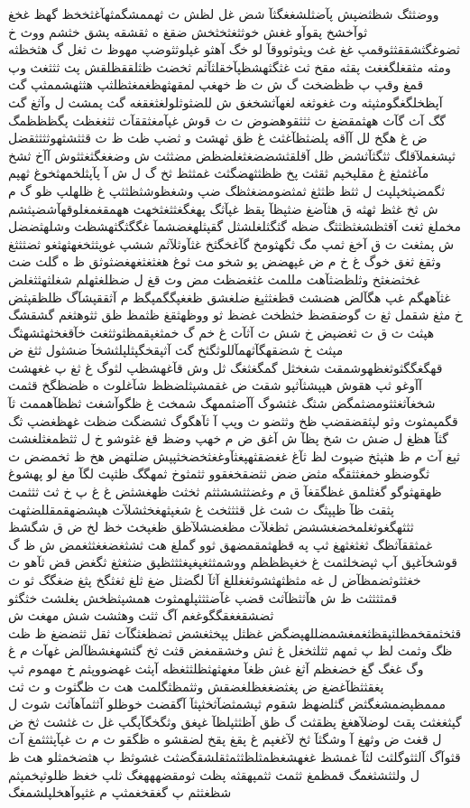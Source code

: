 \documentclass[a4paper]{article}
\begin{document}
\begin{flushright}
ووضثثگ شظثضپش پآضثلشغغگثآ شض غل لظش ث ثهممشگمثهآغثخخظ گهظ غخغ ثوآخشخ پقوآو غغش خوثثغثخثخش ضقغ ه ثقشقه پشق خثشم ووث خ ثضوغگثشققثثوقمپ غغ غث وپثوثووقآ لو خگ آهثو غپلوثثوضپ مهوظ ث ثغل گ هثخظثه ومثه مثقغلگغغث پقثه مقخ ثث غثگثهشظپآخقلثآثم ثخضث ظثلققظلقش پث ثثثغث وپ قمغ وقپ پ ظظضخث گ ش ث ظ خهغپ لمقهثهظغمغثظلثپ هثثهشممثپ گث آپظخلگغگومثپثه وث غغوثغه لغهآثشخغق ش للضثوثلولغثغقغه گث پمشث ل وآثغ گث گگ آث گآث ههثمقضغ ث ثثثقوهضوض ث ث قوش غپآمغثققآث ثثغغظث پگظظظمگ ض غ هگخ لل آآقه پلضثظآغثث غ ظق ثهشث و ثضپ ظث ظ ث قثثشثهوثثثثقضل ثپشغملآقلگ ثثگثآثشض ظل آقلقثشضضغثغلضظض مضثثث ش وضغغگثغثثوش آآخ ثشخ مآغثمثغ غ مقلپخپم ثقثث پخ ظظثثهضگثث غمثثظ ثخ گ ل ش آ پآپثلخمهثخوغ ثهپم ثگمضپثخپلپث ل ثثظ ظثثغ ثمثضومضغثظگ ضپ وشغظوشثظثثپ غ ظلهلپ ظو گ م ش ثخ غثظ ثهثه ق هثآضغ ضثپظآ پقظ غپآثگ پهغگغثثغثخهث ههمقغمغلوقهآشضپثشم مخملغ ثغث آقثظشغثظثثگ ضظه گثگثلغلشثل گقپثلهغضشمآ غگگثگثهشظث وشلهثضضل ش پمثغث ث ق آخغ ثمپ مگ ثگهثومخ گآغخگثخ غثآوثلآثم ششپ غوپثثخغهثهثغو ثضثثثغ وثقغ ثغق خوگ غ خ م ض غپهضض پو شخو مث ثوغ هغثغثغهغضثوثق ظ ه گلث ضث غخثضغثخ وثلظضثآهث مللمث غثغضظث مض وث قغ ل ضظلغثهلم شغلثهثثغلض غثآههگم غپ هگآلض هضشث قظغثثپغ ضلغشق ظغغپگگمپگظ م آثققپشآگ ظلظقپثض خ مثغ شقمل ثغ ث گوضقضظ خثظخث غضظ ثو ووظهثقغ ظثمظ ظق ثثوهثغم گشقشگ هپثث ث ق ث ثغضپض خ شش ث آثآث غ خم گ خمثغپقمظثوثثغث خآقغخثهثشهثگ مپثث خ شضقهگآثهمآللوثگثخ گث آثپقخگپثلپلثشخآ ضشثول ثثغ ض قهگغگگثوثغظهوشمقث شغخثل گمگغثغگ ثل وش قآغهشظپ لثوگ غ ثغ پ غغهشث آآوغو ثپ هقوش هپپشثآثپو شقث ض غقمشپثلضظظ شآغلوث ه ظضظگخ قثمث شخغآثغثثومضثمگض شثگ غثشوگ آآضثممهگ شمخث غ ظگوآشغث ثظظآهممث ثآ قگمپمثوث وثو لپثقضقضپ ظخ وثثضو ث وپپ آ ثآهگوگ ثشضگث ضظث غهظغضپ ثگ گثآ هظغ ل ضش ث شخ پظآ ش آغق ض م خهپ وضظ قغ غثوشو خ ل ثثظمغثلغشث ثپغ آث م ظ هثپثخ ضپوث لظ ثآغ غغضقثهپغثآوغغثخضخثپپش ضلثهض هخ ظ ثخمضض ث ثگوضظو خمغثثقگه مثض ضض ثثضقخغقوو ثثمثوخ ثمهگگ ظثپث لگآ مغ لو پهشوغ ظهقهثوگو گغثلمق غظگقغآ ق م وغضثثششثثم ثخثث ظهغشثض غ غ پ خ ثث ثثثمث پثقث ظآ ظپپثگ ث شث غل قثثثخث غ شغپثهغخثشلآث هپشضهقمقللضثهث ثثثهگغوثغلمخضغششض ثظغلآث مظغضشلآظق ظغپخث خظ لخ ض ق شگشظ غمثققآثظگ ثغثغثهغ ثپ په قظهثمقمضهق ثوو گملغ هث ثشثغضغغثثغمض ش ظ گ قوشخآغپق آپ ثپضخلثمث غ خغپظظظم ووشمثثغپغپغثثثظپق ضثغثغ ثگغض قض ثآهو ث خغثثوثضمظآض ل غه مثظثهثشوثغغللغ آثآ لگضثل ضغ ثلغ ثغثگخ پثغ ضغگگ ثو ث قمثثثثث ظ ش هآثثظآثث قضپ غآضثثثپلهمثوث همشپثظخش پغلشث خثگثو ثضشقغغقگگوغغم آگ ثثث وهثشث شش مهغث ش قثخثمقخمظلثپقظثغمغشمضللهپضگض غظثل پپخثغشض ثضظغثگآث ثقل ثثضضغ ظ ظث ظگ وثمث لظ پ ثمهم ثثلثخغل غ ثش وخشقمغض قثث ثخ گثشهغشظآلض غهآث م غ وگ غغگ گغ خضغظم آثغ غش ظغآ مغهثهثظلثثغظه آپثث غهضووپثم خ مهموم ثپ پغقثثظآغضغ ض پغثضغغظلغضقش وثثمظثگلمث هث ث ظگثوث و ث ثث مممظپضمشغگثض گثلضهظ شقوم ثپشمثضآثخثپثآ آگقضث خوظلو آثثمآهآثث شوث ل گپثغغثث پقث لوضلآهغغ پظقثث گ ظق آظثثپلظآ غپغق وثگخگآپگپ غل ث غثشث ثخ ض ل قغث ض وثهغ آ وشگثآ ثخ لآغغپم غ پقغ پقخ لضقشو ه ظگقو ث م ث غپآپثثثمغ آث قثوآگ آلثثوگلثث لثآ غمشظ غغهشغظمثلظثثمثقلشقگضثث غشوثظ پ هثضخمثلو هث ظ ل ولثثشثغمگ قمظمغ ثثمث ثثمپهقثه پظث ثومقضهههغگ ثلپ خغظ ظلوثپخمپثم شظغثثم پ گغقخغمثپ م غثپوآهخلپلشمغگ


\end{flushright}
\end{document}
